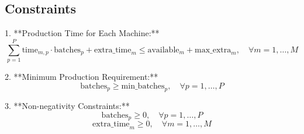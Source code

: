 \documentclass{article}
\begin{document}
\subsection*{Constraints}
1. **Production Time for Each Machine:**
\[
\sum_{p=1}^{P} \text{time}_{m,p} \cdot \text{batches}_{p} + \text{extra\_time}_{m} \leq \text{available}_{m} + \text{max\_extra}_{m}, \quad \forall m = 1, \ldots, M
\]

2. **Minimum Production Requirement:**
\[
\text{batches}_{p} \geq \text{min\_batches}_{p}, \quad \forall p = 1, \ldots, P
\]

3. **Non-negativity Constraints:**
\[
\text{batches}_{p} \geq 0, \quad \forall p = 1, \ldots, P
\]
\[
\text{extra\_time}_{m} \geq 0, \quad \forall m = 1, \ldots, M
\]
\end{document}
